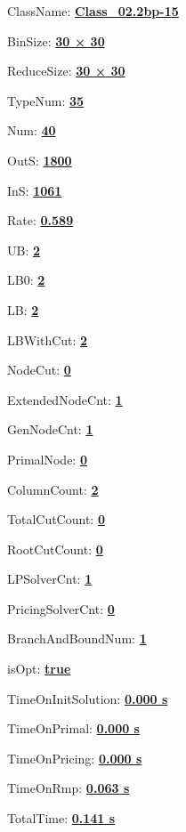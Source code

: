 \documentclass[11pt]{article}
\begin{document}
\pagestyle{empty}


ClassName: \underline{\textbf{Class_02.2bp-15}}
\par
BinSize: \underline{\textbf{30 × 30}}
\par
ReduceSize: \underline{\textbf{30 × 30}}
\par
TypeNum: \underline{\textbf{35}}
\par
Num: \underline{\textbf{40}}
\par
OutS: \underline{\textbf{1800}}
\par
InS: \underline{\textbf{1061}}
\par
Rate: \underline{\textbf{0.589}}
\par
UB: \underline{\textbf{2}}
\par
LB0: \underline{\textbf{2}}
\par
LB: \underline{\textbf{2}}
\par
LBWithCut: \underline{\textbf{2}}
\par
NodeCut: \underline{\textbf{0}}
\par
ExtendedNodeCnt: \underline{\textbf{1}}
\par
GenNodeCnt: \underline{\textbf{1}}
\par
PrimalNode: \underline{\textbf{0}}
\par
ColumnCount: \underline{\textbf{2}}
\par
TotalCutCount: \underline{\textbf{0}}
\par
RootCutCount: \underline{\textbf{0}}
\par
LPSolverCnt: \underline{\textbf{1}}
\par
PricingSolverCnt: \underline{\textbf{0}}
\par
BranchAndBoundNum: \underline{\textbf{1}}
\par
isOpt: \underline{\textbf{true}}
\par
TimeOnInitSolution: \underline{\textbf{0.000 s}}
\par
TimeOnPrimal: \underline{\textbf{0.000 s}}
\par
TimeOnPricing: \underline{\textbf{0.000 s}}
\par
TimeOnRmp: \underline{\textbf{0.063 s}}
\par
TotalTime: \underline{\textbf{0.141 s}}
\par
\newpage
\end{document}
